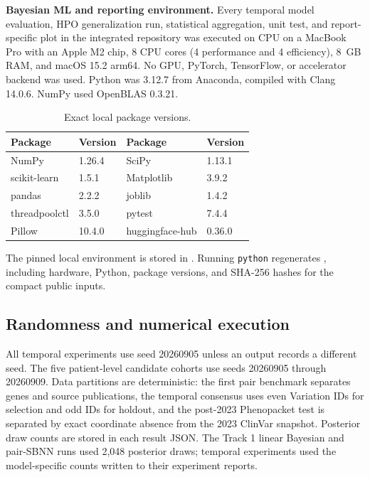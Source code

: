 \documentclass[11pt]{article}
\begin{document}
\textbf{Bayesian ML and reporting environment.} Every temporal model evaluation, HPO generalization run, statistical aggregation, unit test, and report-specific plot in the integrated repository \citep{tourerepo2026} was executed on CPU on a MacBook Pro with an Apple M2 chip, 8 CPU cores (4 performance and 4 efficiency), 8~GB RAM, and macOS 15.2 arm64. No GPU, PyTorch, TensorFlow, or accelerator backend was used. Python was 3.12.7 from Anaconda, compiled with Clang 14.0.6. NumPy used OpenBLAS 0.3.21.

\begin{table}[H]
\centering
\caption{Exact local package versions.}
\begin{tabular}{ll@{\qquad}ll}
\toprule
Package & Version & Package & Version \\
\midrule
NumPy & 1.26.4 & SciPy & 1.13.1 \\
scikit-learn & 1.5.1 & Matplotlib & 3.9.2 \\
pandas & 2.2.2 & joblib & 1.4.2 \\
threadpoolctl & 3.5.0 & pytest & 7.4.4 \\
Pillow & 10.4.0 & huggingface-hub & 0.36.0 \\
\bottomrule
\end{tabular}
\end{table}

The pinned local environment is stored in . Running \texttt{python}  regenerates , including hardware, Python, package versions, and SHA-256 hashes for the compact public inputs.

\subsection{Randomness and numerical execution}

All temporal experiments use seed 20260905 unless an output records a different seed. The five patient-level candidate cohorts use seeds 20260905 through 20260909. Data partitions are deterministic: the first pair benchmark separates genes and source publications, the temporal consensus uses even Variation IDs for selection and odd IDs for holdout, and the post-2023 Phenopacket test is separated by exact coordinate absence from the 2023 ClinVar snapshot. Posterior draw counts are stored in each result JSON. The Track 1 linear Bayesian and pair-SBNN runs used 2,048 posterior draws; temporal experiments used the model-specific counts written to their experiment reports.
\end{document}
